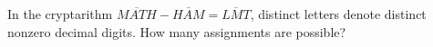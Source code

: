 In the cryptarithm $\overline{MATH}-\overline{HAM}=\overline{LMT}$, distinct letters denote distinct nonzero decimal digits. How many assignments are possible?
